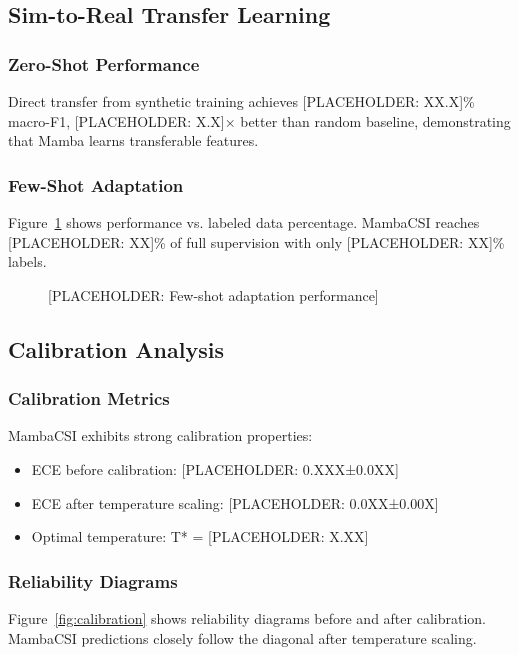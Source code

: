 \documentclass[journal]{IEEEtran}
\begin{document}
\subsection{Sim-to-Real Transfer Learning}

\subsubsection{Zero-Shot Performance}
Direct transfer from synthetic training achieves [PLACEHOLDER: XX.X]\% macro-F1, [PLACEHOLDER: X.X]× better than random baseline, demonstrating that Mamba learns transferable features.

\subsubsection{Few-Shot Adaptation}
Figure~\ref{fig:fewshot} shows performance vs. labeled data percentage. MambaCSI reaches [PLACEHOLDER: XX]\% of full supervision with only [PLACEHOLDER: XX]\% labels.

\begin{figure}[h]
\centering
\caption{[PLACEHOLDER: Few-shot adaptation performance]}
\label{fig:fewshot}
\end{figure}

\subsection{Calibration Analysis}

\subsubsection{Calibration Metrics}
MambaCSI exhibits strong calibration properties:
\begin{itemize}
\item ECE before calibration: [PLACEHOLDER: 0.XXX±0.0XX]
\item ECE after temperature scaling: [PLACEHOLDER: 0.0XX±0.00X]
\item Optimal temperature: T* = [PLACEHOLDER: X.XX]
\end{itemize}

\subsubsection{Reliability Diagrams}
Figure~\ref{fig:calibration} shows reliability diagrams before and after calibration. MambaCSI predictions closely follow the diagonal after temperature scaling.
\end{document}
